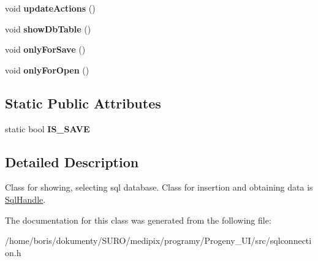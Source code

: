 \begin{DoxyCompactItemize}
\item 
\hypertarget{classSqlConnection_a1f632f61a1baa84358b04600fd5cf1c6}{void {\bfseries update\+Actions} ()}\label{classSqlConnection_a1f632f61a1baa84358b04600fd5cf1c6}

\item 
\hypertarget{classSqlConnection_aa6435ff7a964d00418457111f6f33380}{void {\bfseries show\+Db\+Table} ()}\label{classSqlConnection_aa6435ff7a964d00418457111f6f33380}

\item 
\hypertarget{classSqlConnection_ab497606fdbaefeedf5c9d4223fea3a1d}{void {\bfseries only\+For\+Save} ()}\label{classSqlConnection_ab497606fdbaefeedf5c9d4223fea3a1d}

\item 
\hypertarget{classSqlConnection_a859135cab392d805adc40a58f6d0adf9}{void {\bfseries only\+For\+Open} ()}\label{classSqlConnection_a859135cab392d805adc40a58f6d0adf9}

\end{DoxyCompactItemize}
\subsection*{Static Public Attributes}
\begin{DoxyCompactItemize}
\item 
\hypertarget{classSqlConnection_a0d53b0970637eed7f37c8190fdb2095a}{static bool {\bfseries I\+S\+\_\+\+S\+A\+V\+E}}\label{classSqlConnection_a0d53b0970637eed7f37c8190fdb2095a}

\end{DoxyCompactItemize}


\subsection{Detailed Description}
Class for showing, selecting sql database. Class for insertion and obtaining data is \hyperlink{classSqlHandle}{Sql\+Handle}. 

The documentation for this class was generated from the following file\+:\begin{DoxyCompactItemize}
\item 
/home/boris/dokumenty/\+S\+U\+R\+O/medipix/programy/\+Progeny\+\_\+\+U\+I/src/sqlconnection.\+h\end{DoxyCompactItemize}
